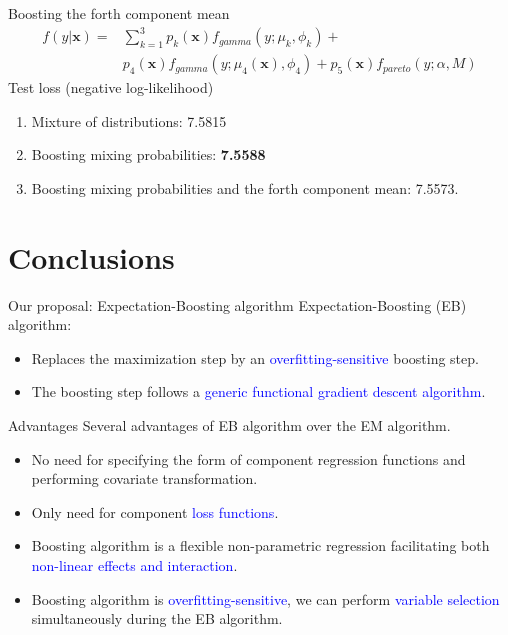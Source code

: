 \documentclass[11pt]{article}
\numberwithin{equation}{section}
\def\bx{\boldsymbol{x}}
\newcommand{\blue}[1]{\textcolor{blue}{#1}}
\begin{document}
\begin{frame}{Boosting the forth component  mean}
	$$
	\begin{aligned}
		f(y|\bx)=&\sum_{k=1}^3p_k(\bx)f_{gamma}(y;\mu_k,\phi_k)+ \\
		&p_4(\bx)f_{gamma}(y;\mu_4(\bx),\phi_4)+ p_5(\bx)f_{pareto}(y;\alpha,M)
	\end{aligned}
	$$
	Test loss (negative log-likelihood)
	\begin{enumerate}
		\item Mixture of distributions:
		7.5815
		\item Boosting mixing probabilities:
		{\bf 7.5588}
		\item Boosting mixing probabilities and the forth component mean:
		7.5573.
	\end{enumerate}
\end{frame}

\section{Conclusions}
\begin{frame}{Our proposal: Expectation-Boosting algorithm}
	Expectation-Boosting (EB) algorithm:
	\begin{itemize}
		\item Replaces the maximization step by an \blue{overfitting-sensitive} boosting step.
		\item The boosting step follows a \blue{generic functional gradient descent algorithm}.
		
	\end{itemize}
\end{frame}

\begin{frame}{Advantages}
	Several advantages of EB algorithm over the EM algorithm.
	\begin{itemize}
		\item No need for specifying the form of component regression functions and performing covariate transformation.
		\item Only need for component \blue{loss functions}.
		\item Boosting algorithm is a flexible non-parametric regression facilitating both \blue{non-linear effects and interaction}.
		\item  Boosting algorithm is \blue{overfitting-sensitive}, we can perform \blue{variable selection} simultaneously during the EB algorithm.
	\end{itemize}
\end{frame}



\end{document}
